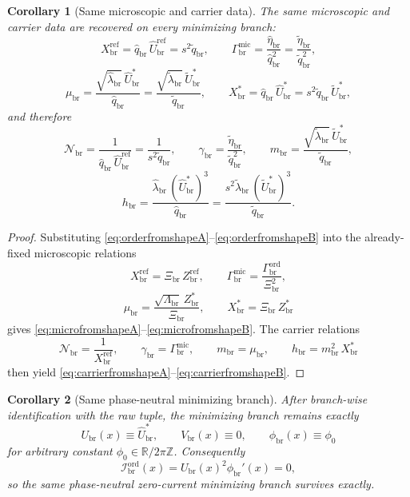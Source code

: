 \documentclass[11pt]{article}
\newcommand{\RespNorm}{\mathcal N_{\mathrm{br}}}
\newcommand{\RespFluxCoeff}{\gamma_{\mathrm{br}}}
\newcommand{\RespGap}{m_{\mathrm{br}}}
\newcommand{\RespBias}{h_{\mathrm{br}}}
\newcommand{\RespMicroRef}{X_{\mathrm{br}}^{\mathrm{ref}}}
\newcommand{\RespMicroFluxCoeff}{\Gamma_{\mathrm{br}}^{\mathrm{mic}}}
\newcommand{\RespMicroGap}{\mu_{\mathrm{br}}}
\newcommand{\RespMicroEq}{X_{\mathrm{br}}^{\ast}}
\newcommand{\RespOrderReadout}{\Xi_{\mathrm{br}}}
\newcommand{\RespOrderRef}{Z_{\mathrm{br}}^{\mathrm{ref}}}
\newcommand{\RespOrderStiff}{\Gamma_{\mathrm{br}}^{\mathrm{ord}}}
\newcommand{\RespOrderQuartic}{\Lambda_{\mathrm{br}}}
\newcommand{\RespOrderEq}{Z_{\mathrm{br}}^{\ast}}
\newcommand{\RespOrderCurrent}{\mathcal I_{\mathrm{br}}^{\mathrm{ord}}}
\newcommand{\RespVacAmp}{U_{\mathrm{br}}}
\newcommand{\RespVacPhase}{\phi_{\mathrm{br}}}
\newcommand{\RespVacCarrier}{V_{\mathrm{br}}}
\newcommand{\RespRawReadout}{\widehat q_{\mathrm{br}}}
\newcommand{\RespRawRef}{\widehat U_{\mathrm{br}}^{\mathrm{ref}}}
\newcommand{\RespRawWell}{\widehat\lambda_{\mathrm{br}}}
\newcommand{\RespRawEq}{\widehat U_{\mathrm{br}}^{\ast}}
\newcommand{\RespRawIso}{\widehat\eta_{\mathrm{br}}}
\newcommand{\RespShapeReadout}{\widetilde q_{\mathrm{br}}}
\newcommand{\RespShapeWell}{\widetilde\lambda_{\mathrm{br}}}
\newcommand{\RespShapeEq}{\widetilde U_{\mathrm{br}}^{\ast}}
\newcommand{\RespShapeIso}{\widetilde\eta_{\mathrm{br}}}
\newtheorem{corollary}{Corollary}
\begin{document}
\begin{corollary}[Same microscopic and carrier data]
\label{cor:samemicroscopic}
The same microscopic and carrier data are recovered on every minimizing branch:
\begin{equation}
\RespMicroRef=\RespRawReadout\,\RespRawRef=s^2\RespShapeReadout,
\qquad
\RespMicroFluxCoeff=\frac{\RespRawIso}{\RespRawReadout^2}=\frac{\RespShapeIso}{\RespShapeReadout^2},
\label{eq:microfromshapeA}
\end{equation}
\begin{equation}
\RespMicroGap=\frac{\sqrt{\RespRawWell}\,\RespRawEq}{\RespRawReadout}
=
\frac{\sqrt{\RespShapeWell}\,\RespShapeEq}{\RespShapeReadout},
\qquad
\RespMicroEq=\RespRawReadout\,\RespRawEq=s^2\RespShapeReadout\,\RespShapeEq,
\label{eq:microfromshapeB}
\end{equation}
and therefore
\begin{equation}
\RespNorm=\frac{1}{\RespRawReadout\,\RespRawRef}=\frac{1}{s^2\RespShapeReadout},
\qquad
\RespFluxCoeff=\frac{\RespShapeIso}{\RespShapeReadout^2},
\qquad
\RespGap=\frac{\sqrt{\RespShapeWell}\,\RespShapeEq}{\RespShapeReadout},
\label{eq:carrierfromshapeA}
\end{equation}
\begin{equation}
\RespBias=\frac{\RespRawWell\,(\RespRawEq)^3}{\RespRawReadout}
=
\frac{s^2\RespShapeWell\,(\RespShapeEq)^3}{\RespShapeReadout}.
\label{eq:carrierfromshapeB}
\end{equation}
\end{corollary}

\begin{proof}
Substituting \eqref{eq:orderfromshapeA}--\eqref{eq:orderfromshapeB} into the already-fixed microscopic relations
\[
\RespMicroRef=\RespOrderReadout\,\RespOrderRef,
\qquad
\RespMicroFluxCoeff=\frac{\RespOrderStiff}{\RespOrderReadout^2},
\]
\[
\RespMicroGap=\frac{\sqrt{\RespOrderQuartic}\,\RespOrderEq}{\RespOrderReadout},
\qquad
\RespMicroEq=\RespOrderReadout\,\RespOrderEq
\]
gives \eqref{eq:microfromshapeA}--\eqref{eq:microfromshapeB}. The carrier relations
\[
\RespNorm=\frac{1}{\RespMicroRef},
\qquad
\RespFluxCoeff=\RespMicroFluxCoeff,
\qquad
\RespGap=\RespMicroGap,
\qquad
\RespBias=\RespGap^2\,\RespMicroEq
\]
then yield \eqref{eq:carrierfromshapeA}--\eqref{eq:carrierfromshapeB}.
\end{proof}

\begin{corollary}[Same phase-neutral minimizing branch]
\label{cor:samephasebranch}
After branch-wise identification with the raw tuple, the minimizing branch remains exactly
\begin{equation}
\RespVacAmp(x)\equiv\RespRawEq,
\qquad
\RespVacCarrier(x)\equiv0,
\qquad
\RespVacPhase(x)\equiv\phi_0
\label{eq:rawphasebranch}
\end{equation}
for arbitrary constant \(\phi_0\in\mathbb R/2\pi\mathbb Z\). Consequently
\begin{equation}
\RespOrderCurrent(x)=\RespVacAmp(x)^2\RespVacPhase'(x)=0,
\label{eq:rawzeroordercurrent}
\end{equation}
so the same phase-neutral zero-current minimizing branch survives exactly.
\end{corollary}
\end{document}
